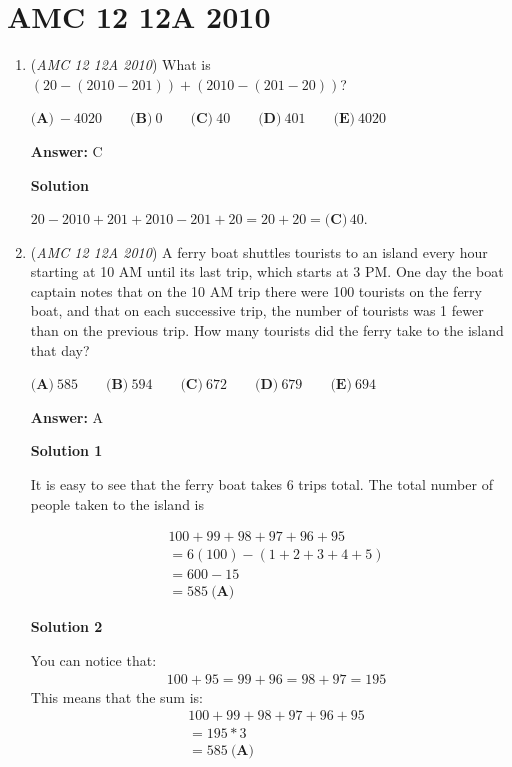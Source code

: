 \section{AMC 12 12A 2010}
        \begin{enumerate}
        	\item (\textit{AMC 12 12A 2010}) What is $\left(20-\left(2010-201\right)\right)+\left(2010-\left(201-20\right)\right)$?


 $\textbf{(A)}\ -4020 \qquad \textbf{(B)}\ 0 \qquad \textbf{(C)}\ 40 \qquad \textbf{(D)}\ 401 \qquad \textbf{(E)}\ 4020$

 \textbf{Answer: }C



\textbf{Solution}

$20-2010+201+2010-201+20=20+20=\boxed{\textbf{(C)}\,40}$.

 


	\item (\textit{AMC 12 12A 2010}) A ferry boat shuttles tourists to an island every hour starting at 10 AM until its last trip, which starts at 3 PM. One day the boat captain notes that on the 10 AM trip there were 100 tourists on the ferry boat, and that on each successive trip, the number of tourists was 1 fewer than on the previous trip. How many tourists did the ferry take to the island that day?


 $\textbf{(A)}\ 585 \qquad \textbf{(B)}\ 594 \qquad \textbf{(C)}\ 672 \qquad \textbf{(D)}\ 679 \qquad \textbf{(E)}\ 694$

 \textbf{Answer: }A



\textbf{Solution 1}

It is easy to see that the ferry boat takes $6$ trips total. The total number of people taken to the island is

 
 \begin{align*}&100+99+98+97+96+95\\  &=6(100)-(1+2+3+4+5)\\  &=600 - 15\\  &=\boxed{585\ \textbf{(A)}}\end{align*}





\textbf{Solution 2}

You can notice that:
 \begin{align*}&100 + 95 = 99 + 96 = 98 + 97 = 195\end{align*}
This means that the sum is:
 \begin{align*}&100+99+98+97+96+95\\  &=195 * 3\\  &=\boxed{585\ \textbf{(A)}}\end{align*}





\end{enumerate}
